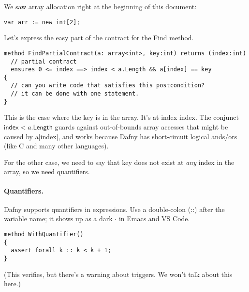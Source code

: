 \documentclass[11pt]{article}
\begin{document}
We saw array allocation right at the beginning of this document:
\begin{lstlisting}[language=dafny]
    var arr := new int[2];
\end{lstlisting}

Let's express the easy part of the contract for the \textsf{Find} method.
\begin{lstlisting}[language=dafny]
method FindPartialContract(a: array<int>, key:int) returns (index:int)
  // partial contract
  ensures 0 <= index ==> index < a.Length && a[index] == key
{
  // can you write code that satisfies this postcondition?
  // it can be done with one statement.
}
\end{lstlisting}
This is the case where the key is in the array. It's at index \textsf{index}.
The conjunct $\mathsf{index} < a.\mathsf{Length}$ guards against out-of-bounds array
accesses that might be caused by \textsf{a[index]}, and works because Dafny has short-circuit
logical ands/ors (like C and many other languages).

For the other case, we need to say that \textsf{key} does not exist at \emph{any}
index in the array, so we need quantifiers.

\paragraph{Quantifiers.} Dafny supports quantifiers in expressions. Use a double-colon (::)
after the variable name; it shows up as a dark $\cdot$ in Emacs and VS Code.

\begin{lstlisting}[language=dafny]
method WithQuantifier()
{
  assert forall k :: k < k + 1;
}
\end{lstlisting}
(This verifies, but there's a warning about triggers. We won't talk about this here.)
\end{document}

